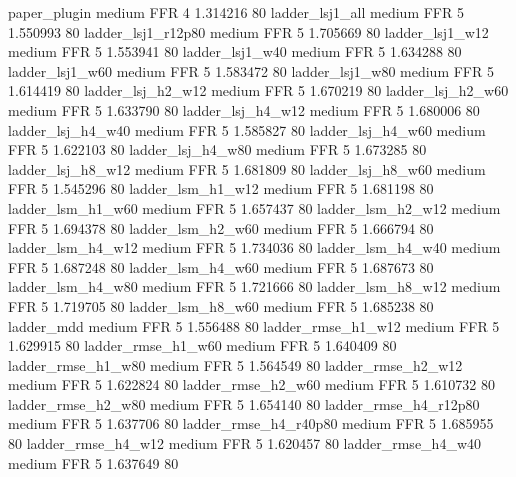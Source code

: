           paper_plugin     medium      FFR                 4 1.314216 80
       ladder_lsj1_all     medium      FFR                 5 1.550993 80
    ladder_lsj1_r12p80     medium      FFR                 5 1.705669 80
       ladder_lsj1_w12     medium      FFR                 5 1.553941 80
       ladder_lsj1_w40     medium      FFR                 5 1.634288 80
       ladder_lsj1_w60     medium      FFR                 5 1.583472 80
       ladder_lsj1_w80     medium      FFR                 5 1.614419 80
     ladder_lsj_h2_w12     medium      FFR                 5 1.670219 80
     ladder_lsj_h2_w60     medium      FFR                 5 1.633790 80
     ladder_lsj_h4_w12     medium      FFR                 5 1.680006 80
     ladder_lsj_h4_w40     medium      FFR                 5 1.585827 80
     ladder_lsj_h4_w60     medium      FFR                 5 1.622103 80
     ladder_lsj_h4_w80     medium      FFR                 5 1.673285 80
     ladder_lsj_h8_w12     medium      FFR                 5 1.681809 80
     ladder_lsj_h8_w60     medium      FFR                 5 1.545296 80
     ladder_lsm_h1_w12     medium      FFR                 5 1.681198 80
     ladder_lsm_h1_w60     medium      FFR                 5 1.657437 80
     ladder_lsm_h2_w12     medium      FFR                 5 1.694378 80
     ladder_lsm_h2_w60     medium      FFR                 5 1.666794 80
     ladder_lsm_h4_w12     medium      FFR                 5 1.734036 80
     ladder_lsm_h4_w40     medium      FFR                 5 1.687248 80
     ladder_lsm_h4_w60     medium      FFR                 5 1.687673 80
     ladder_lsm_h4_w80     medium      FFR                 5 1.721666 80
     ladder_lsm_h8_w12     medium      FFR                 5 1.719705 80
     ladder_lsm_h8_w60     medium      FFR                 5 1.685238 80
            ladder_mdd     medium      FFR                 5 1.556488 80
    ladder_rmse_h1_w12     medium      FFR                 5 1.629915 80
    ladder_rmse_h1_w60     medium      FFR                 5 1.640409 80
    ladder_rmse_h1_w80     medium      FFR                 5 1.564549 80
    ladder_rmse_h2_w12     medium      FFR                 5 1.622824 80
    ladder_rmse_h2_w60     medium      FFR                 5 1.610732 80
    ladder_rmse_h2_w80     medium      FFR                 5 1.654140 80
 ladder_rmse_h4_r12p80     medium      FFR                 5 1.637706 80
 ladder_rmse_h4_r40p80     medium      FFR                 5 1.685955 80
    ladder_rmse_h4_w12     medium      FFR                 5 1.620457 80
    ladder_rmse_h4_w40     medium      FFR                 5 1.637649 80
